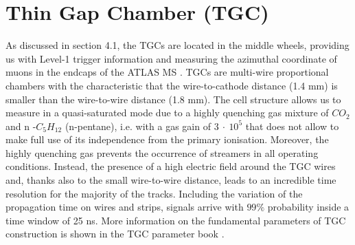 \documentclass[11pt,a4paper,twoside,openright]{report}
\begin{document}
\section{Thin Gap Chamber (TGC)}
As discussed in section 4.1, the TGCs are located in the middle wheels, providing us with Level-1 trigger information and measuring the azimuthal coordinate of muons in the endcaps of the ATLAS MS \cite{TGC1}. TGCs are multi-wire proportional chambers with the characteristic that the wire-to-cathode distance  (1.4 mm) is smaller than the wire-to-wire distance (1.8 mm). The cell structure allows us to measure in a quasi-saturated mode due to a highly quenching gas mixture of \(CO_2\) and \(\text{n -} C_5H_{12}\) (n-pentane), i.e. with a gas gain of \(3\ \cdot\ 10^5\) that does not allow to make full use of its independence from the primary ionisation. Moreover, the highly quenching gas prevents the occurrence of streamers in all operating conditions. Instead, the presence of a high electric field around the TGC wires and, thanks also to the small wire-to-wire distance, leads to an incredible time resolution for the majority of the tracks. Including the variation of the propagation time on wires and strips, signals arrive with \(99\%\) probability inside a time window of 25 ns. More information on the fundamental parameters of TGC construction is shown in the TGC parameter book \cite{TGC}.
\end{document}
